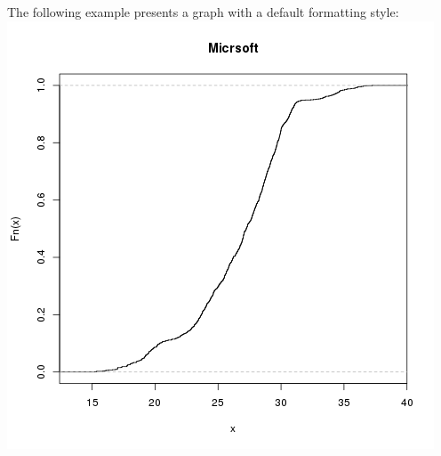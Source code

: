 \documentclass [twoside,
  11pt, a4paper,
  footinclude=true,
  headinclude=true,
  cleardoublepage=empty
]{article}
\begin{document}
The following example presents a graph with a default formatting style:
\includegraphics[scale=0.75]{RPlotExample.png}
 
\end{document}
